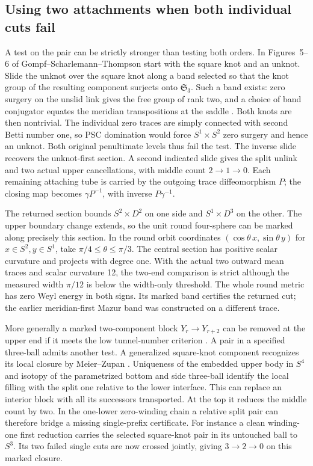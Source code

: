 \documentclass[11pt,letterpaper]{article}
\numberwithin{equation}{section}
\begin{document}
\subsection{Using two attachments when both individual cuts fail}
A test on the pair can be strictly stronger than testing both orders.
In Figures~5--6 of Gompf--Scharlemann--Thompson start with the square
knot and an unknot. Slide the unknot over the square knot along a
band selected so that the knot group of the resulting component
surjects onto \(\mathfrak S_3\). Such a band exists: zero surgery
on the unslid link gives the free group of rank two, and a choice of
band conjugator equates the meridian transpositions at the saddle
\cite[Figures 5--6]{GompfScharlemannThompson2010}\cite{Baker2026HandleCuts}.
Both knots are then nontrivial. The individual zero traces are simply
connected with second Betti number one, so PSC domination would force
\(S^1\times S^2\) zero surgery and hence an unknot. Both original
penultimate levels thus fail the test. The inverse slide recovers
the unknot-first section. A second indicated slide gives the split
unlink and two actual upper cancellations, with middle count
\(2\to1\to0\). Each remaining attaching tube is carried by the
outgoing trace diffeomorphism \(P\); the closing map becomes
\(\gamma P^{-1}\), with inverse \(P\gamma^{-1}\).

The returned section bounds \(S^2\times D^2\) on one side and
\(S^1\times D^3\) on the other. The upper boundary change extends,
so the unit round four-sphere can be marked along precisely this
section. In the round orbit coordinates \((\cos\theta\,x,\sin\theta\,y)\)
for \(x\in S^2,y\in S^1\), take \(\pi/4\le\theta\le\pi/3\).
The central section has positive scalar curvature and projects with
degree one. With the actual two outward mean traces and scalar curvature
12, the two-end comparison is strict although the measured width
\(\pi/12\) is below the width-only threshold. The whole round metric
has zero Weyl energy in both signs. Its marked band certifies the
returned cut; the earlier meridian-first Mazur band was constructed
on a different trace.

More generally a marked two-component block \(Y_r\to Y_{r+2}\)
can be removed at the upper end if it meets the low tunnel-number
criterion \cite[Corollary 1.3]{MeierSchirmerZupan2016Trisections}.
A pair in a specified three-ball admits another test. A generalized
square-knot component recognizes its local closure by Meier--Zupan
\cite[Theorem 1.1]{MeierZupan2022SquareKnots}. Uniqueness of the
embedded upper body in \(S^4\) and isotopy of the parametrized bottom
and side three-ball identify the local filling with the split one
relative to the lower interface. This can replace an interior block
with all its successors transported. At the top it reduces the middle
count by two. In the one-lower zero-winding chain a relative split pair can
therefore bridge a missing single-prefix certificate. For instance a
clean winding-one first reduction carries the selected square-knot pair
in its untouched ball to \(S^3\). Its two failed single cuts are now
crossed jointly, giving \(3\to2\to0\) on this marked closure.
\end{document}
